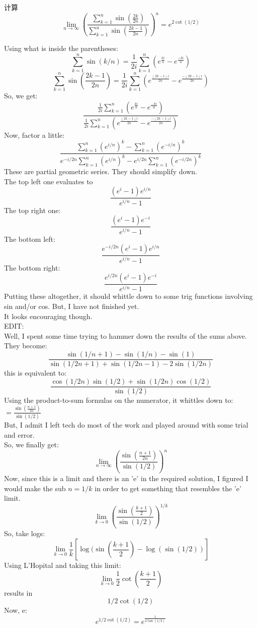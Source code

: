 \documentclass[color=green,titlestyle=hang]{elegantbook}%
\begin{document}
\begin{exercise}
计算\[\lim_{n\to \infty}\left(\frac{\sum_{k=1}^{n}\sin(\frac{2k}{2n})}{\sum_{k=1}^{n}\sin(\frac{2k-1}{2n})}\right)^{n}=e^{2\cot(1/2)}\]
\end{exercise}\begin{newproof}
Using what is inside the parentheses:
\[\sum_{k=1}^{n}\sin(k/n)=\frac{1}{2i}\sum_{k=1}^{n}\left(e^{\frac{ki}{n}}-e^{\frac{-ki}{n}}\right)\]
\[\sum_{k=1}^{n}\sin(\frac{2k-1}{2n})=\frac{1}{2i}\sum_{k=1}^{n}\left(e^{\frac{(2k-1)i}{2n}}-e^{\frac{-(2k-1)i}{2n}}\right)\]
So, we get:	
\[\frac{\frac{1}{2i}\sum_{k=1}^{n}\left(e^{\frac{ki}{n}}-e^{\frac{-ki}{n}}\right)}{\frac{1}{2i}\sum_{k=1}^{n}\left(e^{\frac{(2k-1)i}{2n}}-e^{\frac{-(2k-1)i}{2n}}\right)}\]
Now, factor a little:
\[\frac{\sum_{k=1}^{n}\left(e^{i/n}\right)^{k}-\sum_{k=1}^{n}\left(e^{-i/n}\right)^{k}}{e^{-i/2n}\sum_{k=1}^{n}\left(e^{i/n}\right)^{k}-e^{i/2n}\sum_{k=1}^{n}\left(e^{-i/2n}\right)^{k}}\]
These are partial geometric series. They should simplify down. \\
The top left one evaluates to \[\frac{(e^{i}-1)e^{i/n}}{e^{i/n}-1}\]
The top right one: \[\frac{(e^{i}-1)e^{-i}}{e^{i/n}-1}\]
The bottom left: \[\frac{e^{-i/2n}(e^{i}-1)e^{i/n}}{e^{i/n}-1}\]
The bottom right: \[\frac{e^{i/2n}(e^{i}-1)e^{-i}}{e^{i/n}-1}\]
Putting these altogether, it should whittle down to some trig functions involving sin and/or cos. But, I have not finished yet.\\
It looks encouraging though.\\
EDIT:\\
Well, I spent some time trying to hammer down the results of the sums above.\\
They become:
\[\frac{\sin(1/n+1)-\sin(1/n)-\sin(1)}{\sin(1/2n+1)+\sin(1/2n-1)-2\sin(1/2n)}\]
this is equivalent to:
\[\frac{\cos(1/2n)\sin(1/2)+\sin(1/2n)\cos(1/2)}{\sin(1/2)}\]
Using the product-to-sum formulas on the numerator, it whittles down to:
\(=\frac{\sin(\frac{n+1}{2n})}{\sin(1/2)}\)\\
But, I admit I left tech do most of the work and played around with some trial and error.\\
So, we finally get:
\[\lim_{n\to \infty}\left(\frac{\sin(\frac{n+1}{2n})}{\sin(1/2)}\right)^{n}\]
Now, since this is a limit and there is an 'e' in the required solution, I figured I would make the sub \(\displaystyle n=1/k\) in order to get something that resembles the 'e' limit.
\[\lim_{k\to 0}\left(\frac{\sin(\frac{k+1}{2})}{\sin(1/2)}\right)^{1/k}\]
So, take logs:
\[\lim_{k\to 0}\frac{1}{k}[\log(\sin(\frac{k+1}{2})-\log(\sin(1/2))]\]
Using L'Hopital and taking this limit:
\[\lim_{k\to 0}\frac{1}{2}\cot(\frac{k+1}{2})\]
results in \[1/2\cot(1/2)\]
Now, e: \[e^{1/2\cot(1/2)}=e^{\frac{1}{2\tan(1/2)}}\]
\end{newproof}
\end{document}
